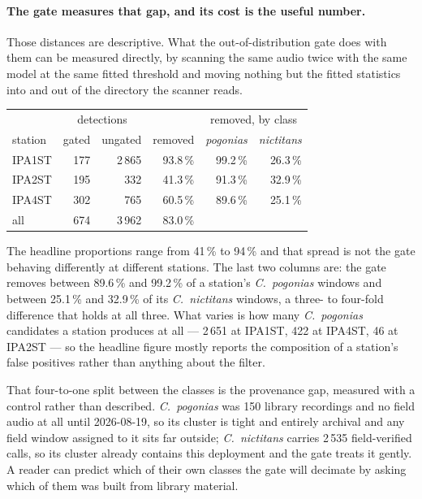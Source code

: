 \documentclass[review,3p,times]{elsarticle}
\begin{document}
\paragraph{The gate measures that gap, and its cost is the useful number.}
Those distances are descriptive. What the out-of-distribution gate does with
them can be measured directly, by scanning the same audio twice with the same
model at the same fitted threshold and moving nothing but the fitted statistics
into and out of the directory the scanner reads.

\begin{center}
\begin{tabular}{lrrrrr}
\toprule
 & \multicolumn{2}{c}{detections} & & \multicolumn{2}{c}{removed, by class} \\
station & gated & ungated & removed & \textit{pogonias} & \textit{nictitans} \\
\midrule
IPA1ST & 177 & 2\,865 & 93.8\,\% & 99.2\,\% & 26.3\,\% \\
IPA2ST & 195 & 332 & 41.3\,\% & 91.3\,\% & 32.9\,\% \\
IPA4ST & 302 & 765 & 60.5\,\% & 89.6\,\% & 25.1\,\% \\
\midrule
all & 674 & 3\,962 & 83.0\,\% & & \\
\bottomrule
\end{tabular}
\end{center}

The headline proportions range from 41\,\% to 94\,\% and that spread is not the
gate behaving differently at different stations. The last two columns are: the
gate removes between 89.6\,\% and 99.2\,\% of a station's \textit{C.\ pogonias}
windows and between 25.1\,\% and 32.9\,\% of its \textit{C.\ nictitans} windows,
a three- to four-fold difference that holds at all three. What varies is how
many \textit{C.\ pogonias} candidates a station produces at all --- 2\,651 at
IPA1ST, 422 at IPA4ST, 46 at IPA2ST --- so the headline figure mostly reports the
composition of a station's false positives rather than anything about the
filter.

That four-to-one split between the classes is the provenance gap, measured with
a control rather than described. \textit{C.\ pogonias} was 150 library
recordings and no field audio at all until 2026-08-19, so its cluster is tight
and entirely archival and any field window assigned to it sits far outside;
\textit{C.\ nictitans} carries 2\,535 field-verified calls, so its cluster
already contains this deployment and the gate treats it gently. A reader can
predict which of their own classes the gate will decimate by asking which of
them was built from library material.
\end{document}
